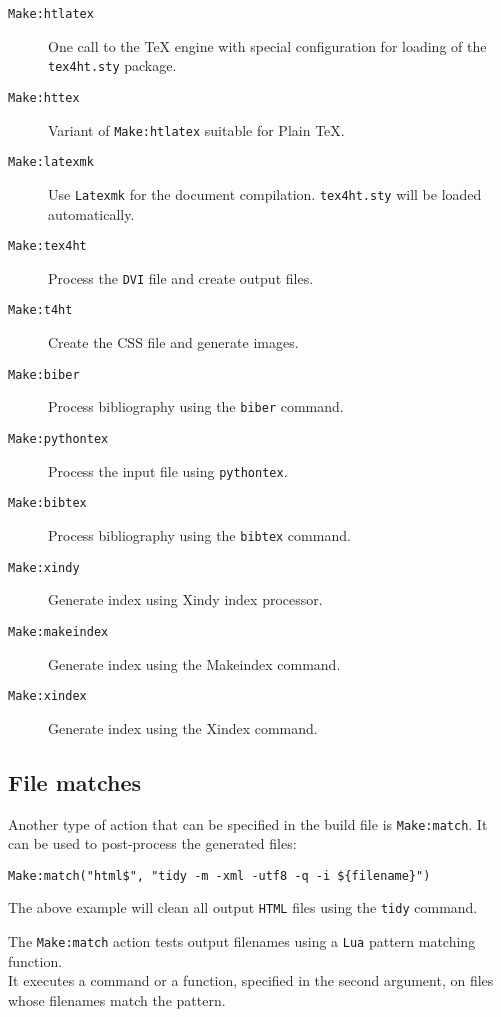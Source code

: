 \begin{description}
\item[\texttt{Make:htlatex}]
One call to the TeX engine with special configuration for loading of the
\texttt{tex4ht.sty} package.
\item[\texttt{Make:httex}]
Variant of \texttt{Make:htlatex} suitable for Plain \TeX.
\item[\texttt{Make:latexmk}]
Use \texttt{Latexmk} for the document compilation. \texttt{tex4ht.sty}
will be loaded automatically.
\item[\texttt{Make:tex4ht}]
Process the \texttt{DVI} file and create output files.
\item[\texttt{Make:t4ht}]
Create the CSS file and generate images.
\item[\texttt{Make:biber}]
Process bibliography using the \texttt{biber} command.
\item[\texttt{Make:pythontex}]
Process the input file using \texttt{pythontex}.
\item[\texttt{Make:bibtex}]
Process bibliography using the \texttt{bibtex} command.
\item[\texttt{Make:xindy}]
Generate index using Xindy index processor.
\item[\texttt{Make:makeindex}]
Generate index using the Makeindex command.
\item[\texttt{Make:xindex}]
Generate index using the Xindex command.
\end{description}

\hypertarget{file-matches}{%
\subsection{File matches}\label{file-matches}}

\label{sec:postprocessing}

Another type of action that can be specified in the build file is
\texttt{Make:match}. It can be used to post-process the generated files:

\begin{verbatim}
Make:match("html$", "tidy -m -xml -utf8 -q -i ${filename}")
\end{verbatim}

The above example will clean all output \texttt{HTML} files using the
\texttt{tidy} command.

The \texttt{Make:match} action tests output filenames using a
\texttt{Lua} pattern matching function.\\
It executes a command or a function, specified in the second argument,
on files whose filenames match the pattern.

